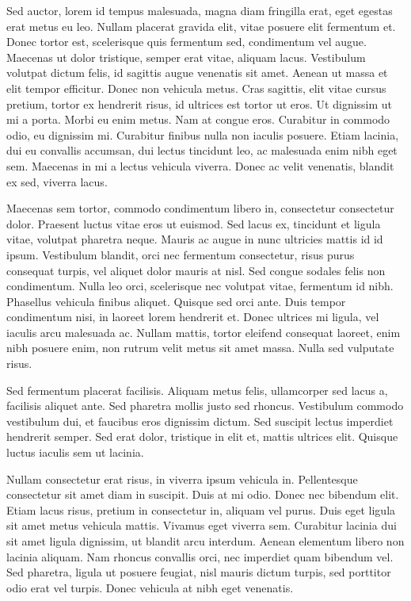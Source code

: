 Sed auctor, lorem id tempus malesuada, magna diam fringilla erat, eget egestas erat metus eu leo. Nullam placerat gravida elit, vitae posuere elit fermentum et. Donec tortor est, scelerisque quis fermentum sed, condimentum vel augue. Maecenas ut dolor tristique, semper erat vitae, aliquam lacus. Vestibulum volutpat dictum felis, id sagittis augue venenatis sit amet. Aenean ut massa et elit tempor efficitur. Donec non vehicula metus. Cras sagittis, elit vitae cursus pretium, tortor ex hendrerit risus, id ultrices est tortor ut eros. Ut dignissim ut mi a porta. Morbi eu enim metus. Nam at congue eros. Curabitur in commodo odio, eu dignissim mi. Curabitur finibus nulla non iaculis posuere. Etiam lacinia, dui eu convallis accumsan, dui lectus tincidunt leo, ac malesuada enim nibh eget sem. Maecenas in mi a lectus vehicula viverra. Donec ac velit venenatis, blandit ex sed, viverra lacus.

Maecenas sem tortor, commodo condimentum libero in, consectetur consectetur dolor. Praesent luctus vitae eros ut euismod. Sed lacus ex, tincidunt et ligula vitae, volutpat pharetra neque. Mauris ac augue in nunc ultricies mattis id id ipsum. Vestibulum blandit, orci nec fermentum consectetur, risus purus consequat turpis, vel aliquet dolor mauris at nisl. Sed congue sodales felis non condimentum. Nulla leo orci, scelerisque nec volutpat vitae, fermentum id nibh. Phasellus vehicula finibus aliquet. Quisque sed orci ante. Duis tempor condimentum nisi, in laoreet lorem hendrerit et. Donec ultrices mi ligula, vel iaculis arcu malesuada ac. Nullam mattis, tortor eleifend consequat laoreet, enim nibh posuere enim, non rutrum velit metus sit amet massa. Nulla sed vulputate risus.

Sed fermentum placerat facilisis. Aliquam metus felis, ullamcorper sed lacus a, facilisis aliquet ante. Sed pharetra mollis justo sed rhoncus. Vestibulum commodo vestibulum dui, et faucibus eros dignissim dictum. Sed suscipit lectus imperdiet hendrerit semper. Sed erat dolor, tristique in elit et, mattis ultrices elit. Quisque luctus iaculis sem ut lacinia.

Nullam consectetur erat risus, in viverra ipsum vehicula in. Pellentesque consectetur sit amet diam in suscipit. Duis at mi odio. Donec nec bibendum elit. Etiam lacus risus, pretium in consectetur in, aliquam vel purus. Duis eget ligula sit amet metus vehicula mattis. Vivamus eget viverra sem. Curabitur lacinia dui sit amet ligula dignissim, ut blandit arcu interdum. Aenean elementum libero non lacinia aliquam. Nam rhoncus convallis orci, nec imperdiet quam bibendum vel. Sed pharetra, ligula ut posuere feugiat, nisl mauris dictum turpis, sed porttitor odio erat vel turpis. Donec vehicula at nibh eget venenatis.

